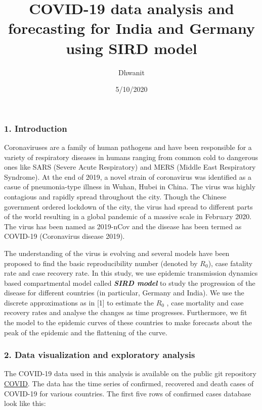 \documentclass[]{article}
\title{COVID-19 data analysis and forecasting for India and Germany using SIRD
model}
\author{Dhwanit}
\date{5/10/2020}
\begin{document}
\maketitle

\hypertarget{introduction}{%
\subsubsection{1. Introduction}\label{introduction}}

Coronaviruses are a family of human pathogens and have been responsible
for a variety of respiratory diseases in humans ranging from common cold
to dangerous ones like SARS (Severe Acute Respiratory) and MERS (Middle
East Respiratory Syndrome). At the end of 2019, a novel strain of
coronavirus was identified as a casue of pneumonia-type illness in
Wuhan, Hubei in China. The virus was highly contagious and rapidly
spread throughout the city. Though the Chinese government ordered
lockdown of the city, the virus had spread to different parts of the
world resulting in a global pandemic of a massive scale in February
2020. The virus has been named as 2019-nCov and the disease has been
termed as COVID-19 (Coronavirus disease 2019).

The understanding of the virus is evolving and several models have been
proposed to find the basic reproducibility number (denoted by
\(R_{0}\)), case fatality rate and case recovery rate. In this study, we
use epidemic transmission dynamics based compartmental model called
\textbf{\emph{SIRD model}} to study the progression of the disease for
different countries (in particular, Germany and India). We use the
discrete approximations as in {[}1{]} to estimate the \(R_{0}\) , case
mortality and case recovery rates and analyse the changes as time
progresses. Furthermore, we fit the model to the epidemic curves of
these countries to make forecasts about the peak of the epidemic and the
flattening of the curve.

\hypertarget{data-visualization-and-exploratory-analysis}{%
\subsubsection{2. Data visualization and exploratory
analysis}\label{data-visualization-and-exploratory-analysis}}

The COVID-19 data used in this analysis is available on the public git
repository
\href{https://github.com/CSSEGISandData/COVID-19/tree/master/csse_covid_19_data/csse_covid_19_time_series}{COVID}.
The data has the time series of confirmed, recovered and death cases of
COVID-19 for various countries. The first five rows of confirmed cases
database look like this:
\end{document}
